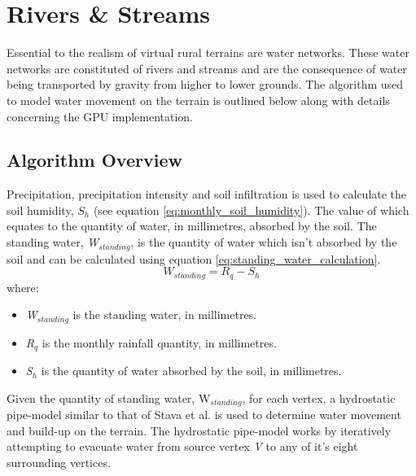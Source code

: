 \section{Rivers \& Streams}

Essential to the realism of virtual rural terrains are water networks. These water networks are constituted of rivers and streams and are the consequence of water being transported by gravity from higher to lower grounds. The algorithm used to model water movement on the terrain is outlined below along with details concerning the GPU implementation.

\subsection{Algorithm Overview}

Precipitation, precipitation intensity and soil infiltration is used to calculate the soil humidity, $S_{h}$ (see equation \ref{eq:monthly_soil_humidity}). The value of which equates to the quantity of water, in millimetres, absorbed by the soil. The standing water, \textit{W$_{standing}$}, is the quantity of water which isn't absorbed by the soil and can be calculated using equation \ref{eq:standing_water_calculation}.\\

\begin{equation} \label{eq:standing_water_calculation}
	W_{standing} = R_{q} - S_{h}
\end{equation}
where:
\begin{itemize}
\item \textit{W$_{standing}$} is the standing water, in millimetres.\\
\item \textit{R$_{q}$} is the monthly rainfall quantity, in millimetres.\\
\item \textit{S$_{h}$} is the quantity of water absorbed by the soil, in millimetres.\\
\end{itemize}

Given the quantity of standing water, W$_{standing}$, for each vertex, a hydrostatic pipe-model similar to that of Stava et al. \cite{StAva2008} is used to determine water movement and build-up on the terrain. The hydrostatic pipe-model works by iteratively attempting to evacuate water from source vertex \textit{V} to any of it's eight surrounding vertices.\\

